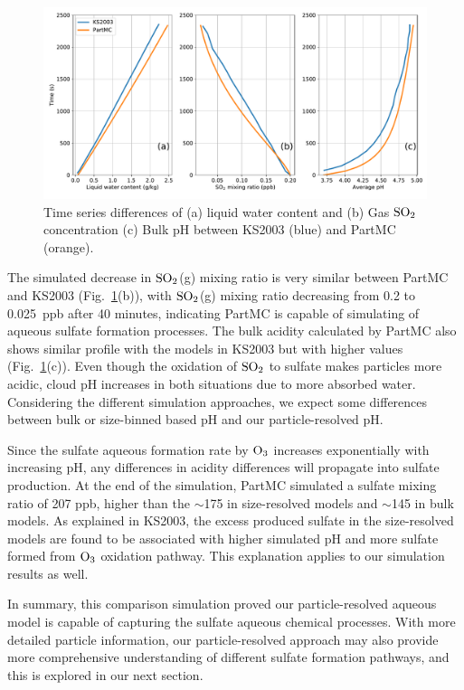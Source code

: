 \documentclass[edeposit,fullpage]{uiucthesis2009}
\begin{document}
\begin{figure}[ht]
    \centering \includegraphics[scale=0.5]{chap2_figs/chap2_fig1_profile.pdf}
    \caption{Time series differences of (a) liquid water content
      and (b) Gas $\rm SO_2$ concentration (c) Bulk pH between KS2003 (blue)
      and PartMC (orange).}
    \label{chap2:ks2003}
\end{figure}

The simulated decrease in $\rm SO_2$(g) mixing ratio is very similar
between PartMC and KS2003 (Fig.~\ref{chap2:ks2003}(b)), with $\rm
SO_2$(g) mixing ratio decreasing from 0.2 to 0.025~ppb after 40
minutes, indicating PartMC is capable of simulating of aqueous sulfate
formation processes. The bulk acidity calculated by PartMC also shows
similar profile with the models in KS2003 but with higher values
(Fig.~\ref{chap2:ks2003}(c)). Even though the oxidation of $\rm SO_2$ 
to sulfate makes particles more acidic, cloud pH increases in both situations 
due to more absorbed water. Considering the different simulation
approaches, we expect some differences between bulk or size-binned
based pH and our particle-resolved pH.

Since the sulfate aqueous formation rate by $\rm O_3$ increases
exponentially with increasing pH, any differences in acidity
differences will propagate into sulfate production. At the end of the
simulation, PartMC simulated a sulfate mixing ratio of 207 ppb, higher
than the $\sim$175 in size-resolved models and $\sim$145 in bulk
models. As explained in KS2003, the excess produced sulfate in the
size-resolved models are found to be associated with higher simulated
pH and more sulfate formed from $\rm O_3$ oxidation pathway. This
explanation applies to our simulation results as well.

In summary, this comparison simulation proved our particle-resolved
aqueous model is capable of capturing the sulfate aqueous chemical
processes.  With more detailed particle information, our
particle-resolved approach may also provide more comprehensive
understanding of different sulfate formation pathways, and this is
explored in our next section.
\end{document}
